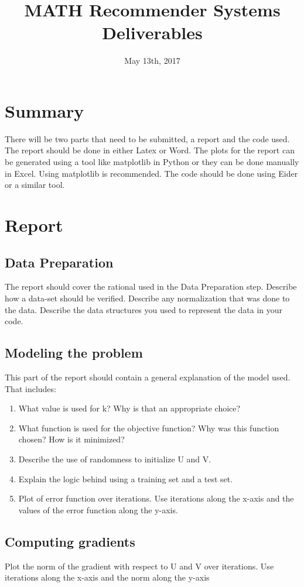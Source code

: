 \documentclass{exam}
\title{MATH Recommender Systems Deliverables}
\date{May 13th, 2017}
\begin{document}
\maketitle
\section{Summary}
There will be two parts that need to be submitted, a report and the code used. The report should be done in either Latex or Word. The plots for the report can be generated using a tool like matplotlib in Python or they can be done manually in Excel. Using matplotlib is recommended. The code should be done using Eider or a similar tool. 

\section{Report}
\subsection{Data Preparation}
The report should cover the rational used in the Data Preparation step. Describe how a data-set should be verified. Describe any normalization that was done to the data. Describe the data structures you used to represent the data in your code. 

\subsection{Modeling the problem}
This part of the report should contain a general explanation of the model used. That includes:
\begin{enumerate}
\item What value is used for k? Why is that an appropriate choice?
\item What function is used for the objective function? Why was this function chosen? How is it minimized?
\item Describe the use of randomness to initialize U and V.
\item Explain the logic behind using a training set and a test set.
\item Plot of error function over iterations. Use iterations along the x-axis and the values of the error function along the y-axis.
\end{enumerate}

\subsection{Computing gradients}
Plot the norm of the gradient with respect to U and V over iterations. Use iterations along the x-axis and the norm along the y-axis
\end{document}
